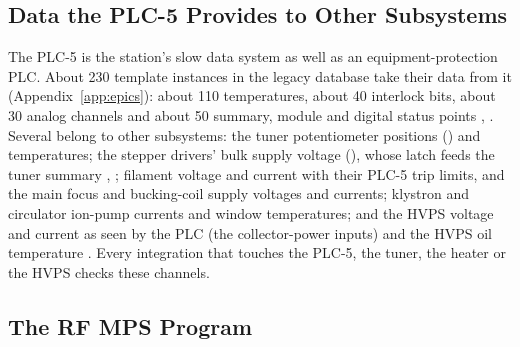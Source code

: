 \subsection{Data the PLC-5 Provides to Other Subsystems}\label{sec:plc5data}

The PLC-5 is the station's slow data system as well as an equipment-protection PLC.
About 230 template instances in the legacy database take their data from it
(Appendix~\ref*{app:epics}): about 110 temperatures, about 40 interlock bits, about 30
analog channels and about 50 summary, module and digital status points ,
. Several belong to other subsystems: the tuner potentiometer positions
() and temperatures; the stepper drivers' bulk supply
voltage (), whose latch feeds the tuner summary ,
; filament voltage and current with their PLC-5 trip limits, and the main focus
and bucking-coil supply voltages and currents; klystron and circulator ion-pump
currents and window temperatures; and the HVPS voltage and current as seen by the PLC
(the collector-power inputs) and the HVPS oil temperature . Every integration
that touches the PLC-5, the tuner, the heater or the HVPS checks these channels.

\subsection{The RF MPS Program}\label{sec:plc5prog}

